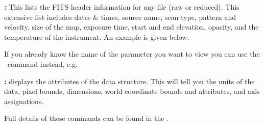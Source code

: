 \documentclass[11pt,oneside,chapters]{starlink}
\begin{document}
\begin{aligndesc}
\item[\textbf{\task{fitslist}:}] This lists the FITS header
  information for any file (raw or reduced). This extensive list
  includes dates \& times, source name, scan type, pattern and
  velocity, size of the map, exposure time, start and end elevation,
  opacity, and the temperature of the instrument. An example is given
  below:
\begin{terminalv}
\end{terminalv}

If you already know the name of the parameter you want to view you can
use the \fitsval\ command instead, e.g.%
\begin{terminalv}
\end{terminalv}

\item[\textbf{\task{ndftrace}:}]  displays the
  attributes of the data structure. This will tell you the units of
  the data, pixel bounds, dimensions, world coordinate bounds and
  attributes, and axis assignations.
\begin{terminalv}
\end{terminalv}

\end{aligndesc}


Full details of these commands can be found in the
.
\end{document}
